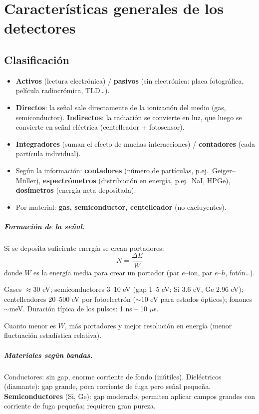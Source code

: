 \chapter{Características generales de los detectores}

\section{Clasificación}
\begin{clave}
\begin{itemize}
\item \textbf{Activos} (lectura electrónica) / \textbf{pasivos} (sin electrónica: placa fotográfica, película radiocrómica, TLD\dots).
\item \textbf{Directos}: la señal sale directamente de la ionización del medio (gas, semiconductor).
\textbf{Indirectos}: la radiación se convierte en luz, que luego se convierte en señal eléctrica (centelleador + fotosensor).
\item \textbf{Integradores} (suman el efecto de muchas interacciones) / \textbf{contadores} (cada partícula individual).
\item Según la información: \textbf{contadores} (número de partículas, p.ej.\ Geiger--Müller),
\textbf{espectrómetros} (distribución en energía, p.ej.\ NaI, HPGe), \textbf{dosímetros} (energía neta depositada).
\item Por material: \textbf{gas, semiconductor, centelleador} (no excluyentes).
\end{itemize}
\end{clave}

\paragraph{Formación de la señal.} Si se deposita suficiente energía se crean portadores:
\[ N=\frac{\Delta E}{W} \]
donde $W$ es la energía media para crear un portador (par $e$--ion, par $e$--$h$, fotón\dots).
\begin{dato}
Gases $\approx30$ eV; semiconductores 3--10 eV (gap 1--5 eV; Si 3.6 eV, Ge 2.96 eV); centelleadores 20--500 eV por fotoelectrón ($\sim10$ eV para estados ópticos);
fonones $\sim$meV. Duración típica de los pulsos: 1 ns -- 10 $\mu$s.
\end{dato}
Cuanto menor es $W$, más portadores y mejor resolución en energía (menor fluctuación estadística relativa).

\paragraph{Materiales según bandas.} Conductores: sin gap, enorme corriente de fondo (inútiles).
Dieléctricos (diamante): gap grande, poca corriente de fuga pero señal pequeña.
\textbf{Semiconductores} (Si, Ge): gap moderado, permiten aplicar campos grandes con corriente de fuga
pequeña; requieren gran pureza.

